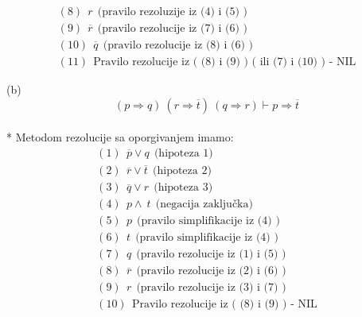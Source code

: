 \documentclass[12pt]{article}
\begin{document}
\begin{enumerate}
\begin{align*}
		    (8)~~ r ~~ \text{(pravilo~rezoluzije~iz~(4)~i~(5)~)} \\
		    
		    (9)~~ \overline{r} ~~ \text{(pravilo~rezolucije~iz~(7)~i~(6)~)} \\
		    
		    (10)~~ \overline{q} ~~ \text{(pravilo~rezolucije~iz~(8)~i~(6)~)} \\
		    
		    (11)~~ \text{Pravilo~rezolucije~iz~(~(8)~i~(9)~)~(~ili~(7)~i~(10)~)~-~NIL}
 		\end{align*}
 		
 		\newpage
 		
 		(b) \begin{equation*}
		    (p \Rightarrow q)~(r \Rightarrow \overline{t})~(q \Rightarrow r) \vdash p \Rightarrow \overline{t}
		\end{equation*}
 		\\
		* Metodom rezolucije sa oporgivanjem imamo: 
		\begin{align*}    
		
		    (1)~~ \overline{p} \vee q ~~ \text{(hipoteza~1)} \\
		    
		    (2)~~ \overline{r} \vee \overline{t} ~~ \text{(hipoteza~2)} \\
		    
		    (3)~~ \overline{q} \vee r ~~ \text{(hipoteza~3)} \\
		    
		    (4)~~ p \wedge~t ~~ \text{(negacija zaključka)} \\
		    
		    (5)~~ p ~~ \text{(pravilo~simplifikacije~iz~(4)~)} \\
		    
		    (6)~~ t ~~ \text{(pravilo~simplifikacije~iz~(4)~)} \\
		    
		    (7)~~ q ~~ \text{(pravilo~rezolucije~iz~(1)~i~(5)~)} \\
		    
		    (8)~~ \overline{r} ~~ \text{(pravilo~rezolucije~iz~(2)~i~(6)~)} \\
		    
		    (9)~~ r ~~ \text{(pravilo~rezolucije~iz~(3)~i~(7)~)} \\
		    
		    (10)~~ \text{Pravilo~rezolucije~iz~(~(8)~i~(9)~)~-~NIL}
		    
 		
		\end{align*}
		\newpage
		

\end{enumerate}
\end{document}
